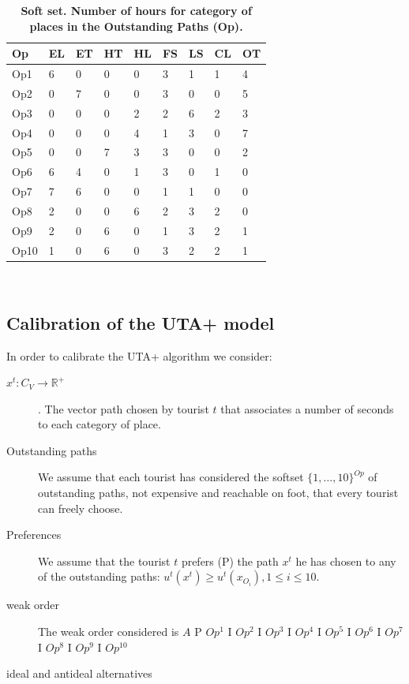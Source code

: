 \documentclass[a4paper]{article}
\begin{document}
\begin{table}[h]
\centering
\begin{tabular}{lllllllll}
\hline
Op&EL&ET&HT&HL&FS&LS&CL&OT \\
\hline
Op1&6&0&0&0&3&1&1&4 \\
Op2&0&7&0&0&3&0&0&5 \\
Op3&0&0&0&2&2&6&2&3 \\
Op4&0&0&0&4&1&3&0&7 \\
Op5&0&0&7&3&3&0&0&2 \\
Op6&6&4&0&1&3&0&1&0 \\
Op7&7&6&0&0&1&1&0&0 \\
Op8&2&0&0&6&2&3&2&0 \\
Op9&2&0&6&0&1&3&2&1 \\
Op10&1&0&6&0&3&2&2&1 \\
\hline
\end{tabular}
\caption{\textbf{ Soft set. Number of hours for category of places in the Outstanding Paths (Op).}}\
\label{Table2}
\end{table}


\subsection{Calibration of the UTA+ model}

In order to calibrate the UTA+ algorithm we consider:
\begin{description}
    \item[{$x^t: C_V \rightarrow {\mathbb{R}^+}$}]. The vector path chosen by tourist $t$ that associates a number of seconds to each category of place.
    \item[Outstanding paths]  We assume that each tourist has considered the softset ${\{1, \dots, 10\}}^{Op}$ of outstanding paths, not expensive and reachable on foot, that every tourist can freely choose.
    \item[Preferences] We assume that the tourist $t$ prefers (P) the path $x^t$ he has chosen to any of the outstanding paths: $u^t(x^t) \geq u^t(x_{O_i}), 1 \leq  i \leq 10$.
    \item[weak order] The weak order considered is $A$ P $Op^1$ I $Op^2$ I $Op^3$ I $Op^4$ I $Op^5$ I $Op^6$ I $Op^7$ I $Op^8$ I $Op^9$ I $Op^{10}$
    \item[ideal and antideal alternatives]
\end{description}
\end{document}
